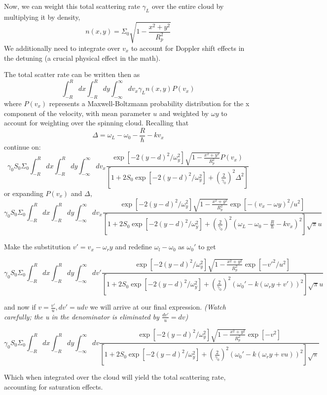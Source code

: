 \documentclass[11pt, oneside,reqno]{amsart}   	%
\newcommand{\eqn}[1]{\begin{equation}#1 \end{equation}}
\begin{document}
Now, we can weight this total scattering rate $\gamma_L$ over the entire cloud by multiplying it by density, \eqn{n(x,y) = \Sigma_0 \sqrt{1-\frac{x^2+y^2}{R_p^2}}}
We additionally need to integrate over $v_x$ to account for Doppler shift effects in the detuning (a crucial physical effect in the math).

The total scatter rate can be written then as
\eqn{ \int_{-R}^{R} dx \int_{-R}^R  dy \int_{-\infty}^{\infty} dv_x \gamma_L n(x,y) P(v_x)}
where $P(v_x)$ represents a Maxwell-Boltzmann probability distribution for the x component of the velocity, with mean parameter $u$ and weighted by $\omega y$ to account for weighting over the spinning cloud.  Recalling that  \eqn{\Delta= \omega_L - \omega_0 - \frac{R}{\hbar} - kv_x}
continue on:
\eqn{ \gamma_0 S_0 \Sigma_0
 \int_{-R}^{R} dx \int_{-R}^R  dy \int_{-\infty}^{\infty} dv_x 
 \frac{
 \exp [ -2 (y-d)^2/\omega_y^2] \sqrt{1-\frac{x^2+y^2}{R_p^2}} P(v_x)}
 { \left[ 1+2S_0 \exp [ -2 (y-d)^2/\omega_y^2] +\left( \frac{2}{\gamma_0} \right)^2 \Delta^2 \right]}
 }
or expanding $P(v_x)$ and $\Delta$,
\eqn{ \gamma_0 S_0 \Sigma_0
 \int_{-R}^{R} dx \int_{-R}^R  dy \int_{-\infty}^{\infty} dv_x 
 \frac{
 \exp [ -2 (y-d)^2/\omega_y^2] \sqrt{1-\frac{x^2+y^2}{R_p^2}} \exp [- (v_x-\omega y)^2 /u^2]
 }
 { \left[ 1+2S_0 \exp [ -2 (y-d)^2/\omega_y^2] +\left( \frac{2}{\gamma_0} \right)^2  (\omega_L - \omega_0 - \frac{R}{\hbar} - kv_x)^2 \right]\sqrt{\pi} u}
 }
 
 Make the substitution $v'= v_x-\omega_r y$ and redefine $\omega_l-\omega_0$ as $\omega_0'$ to get

 \eqn{ \gamma_0 S_0 \Sigma_0
 \int_{-R}^{R} dx \int_{-R}^R  dy \int_{-\infty}^{\infty} dv' 
 \frac{
 \exp [ -2 (y-d)^2/\omega_y^2] \sqrt{1-\frac{x^2+y^2}{R_p^2}} \exp [-v'^2 /u^2]
 }
 { \left[ 1+2S_0 \exp [ -2 (y-d)^2/\omega_y^2] +\left( \frac{2}{\gamma_0} \right)^2  (\omega_0' - k(\omega_r y +v'))^2 \right]\sqrt{\pi} u}
 } 

and now if $v= \frac{v'}{u}, dv'=udv$ we will arrive at our final expression.\emph{ (Watch carefully; the u in the denominator is eliminated by $\frac{dv'}{u} = dv$)}

 \eqn{ \gamma_0 S_0 \Sigma_0
 \int_{-R}^{R} dx \int_{-R}^R  dy \int_{-\infty}^{\infty} dv 
 \frac{
 \exp [ -2 (y-d)^2/\omega_y^2] \sqrt{1-\frac{x^2+y^2}{R_p^2}} \exp [-v^2]
 }
 { \left[ 1+2S_0 \exp [ -2 (y-d)^2/\omega_y^2] +\left( \frac{2}{\gamma_0} \right)^2  (\omega_0' - k(\omega_r y +v u))^2 \right]\sqrt{\pi}}
 } 
 
 Which when integrated over the cloud will yield the total scattering rate, accounting for saturation effects.
\newpage
\end{document}
